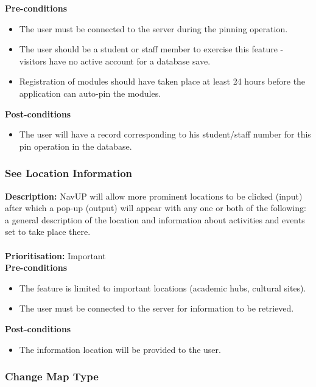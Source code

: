 \documentclass[runningheads,a4paper]{article}
\begin{document}
  
\textbf{Pre-conditions}
\begin{itemize}
 	\item The user must be connected to the server during the pinning operation.
	\item The user should be a student or staff member to exercise this feature - visitors have no active account for a database save.
	\item Registration of modules should have taken place at least 24 hours before the application can auto-pin the modules.
\end{itemize}
  
\textbf{Post-conditions}
\begin{itemize}
  	\item The user will have a record corresponding to his student/staff number for this pin operation in the database.
\end{itemize}

\subsubsection{See Location Information}

\textbf{Description:}  NavUP will allow more prominent locations to be clicked (input) after which a pop-up (output) will appear with any one or both of the following: a general description of the location and information about activities and events set to take place there.\\\\
\noindent
\textbf{Prioritisation:} Important\\
  
  
\textbf{Pre-conditions}
\begin{itemize}
 	\item The feature is limited to important locations (academic hubs, cultural sites).
	\item The user must be connected to the server for information to be retrieved.
\end{itemize}
  
\textbf{Post-conditions}
\begin{itemize}
  	\item The information location will be provided to the user.
\end{itemize}

\subsubsection{Change Map Type}
\end{document}
